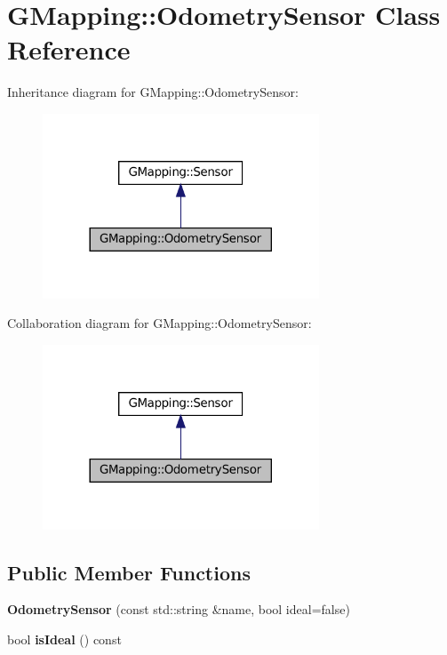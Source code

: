 \hypertarget{classGMapping_1_1OdometrySensor}{}\section{G\+Mapping\+:\+:Odometry\+Sensor Class Reference}
\label{classGMapping_1_1OdometrySensor}


Inheritance diagram for G\+Mapping\+:\+:Odometry\+Sensor\+:
\nopagebreak
\begin{figure}[H]
\begin{center}
\leavevmode
\includegraphics[width=233pt]{classGMapping_1_1OdometrySensor__inherit__graph}
\end{center}
\end{figure}


Collaboration diagram for G\+Mapping\+:\+:Odometry\+Sensor\+:
\nopagebreak
\begin{figure}[H]
\begin{center}
\leavevmode
\includegraphics[width=233pt]{classGMapping_1_1OdometrySensor__coll__graph}
\end{center}
\end{figure}
\subsection*{Public Member Functions}
\begin{DoxyCompactItemize}
\item 
\mbox{\label{classGMapping_1_1OdometrySensor_a6eeefc3b376c27eb2dddb0e3f5221de1}} 
{\bfseries Odometry\+Sensor} (const std\+::string \&name, bool ideal=false)
\item 
\mbox{\label{classGMapping_1_1OdometrySensor_a51a6b33e776ddc7afafe14be223cbd12}} 
bool {\bfseries is\+Ideal} () const
\end{DoxyCompactItemize}
